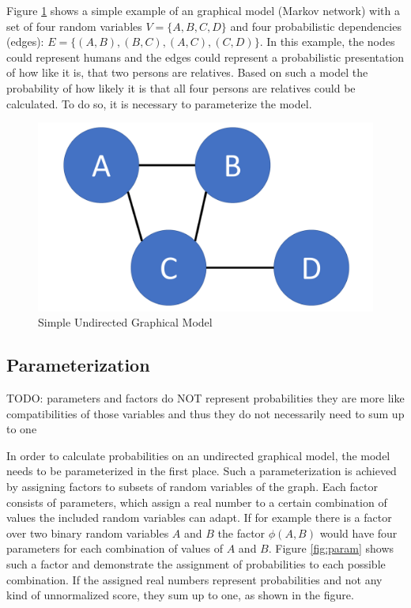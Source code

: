 Figure \ref{fig:basic} shows a simple example of an graphical model (Markov network) with a set of four random variables $V=\{A,B,C,D\}$ and four probabilistic dependencies (edges): $E=\{(A,B),(B,C),(A,C),(C,D)\}$. In this example, the nodes could represent humans and the edges could represent a probabilistic presentation of how like it is, that two persons are relatives. Based on such a model the probability of how likely it is that all four persons are relatives could be calculated. To do so, it is necessary to parameterize the model.

\begin{figure}[htpb]
  \centering
  	\includegraphics[scale=0.3]{img/basic.pdf} 
  \caption{Simple Undirected Graphical Model}
  \label{fig:basic}
\end{figure}

\subsection{Parameterization}

TODO: parameters and factors do NOT represent probabilities \cite{koller2009probabilistic} they are more like compatibilities of those variables and thus they do not necessarily need to sum up to one

In order to calculate probabilities on an undirected graphical model, the model needs to be parameterized in the first place. Such a parameterization is achieved by assigning factors to subsets of random variables of the graph. Each factor consists of parameters, which assign a real number to a certain combination of values the included random variables can adapt. If for example there is a factor over two binary random variables $A$ and $B$ the factor $\phi(A,B)$ would have four parameters for each combination of values of $A$ and $B$. Figure \ref{fig:param} shows such a factor and demonstrate the assignment of probabilities to each possible combination. If the assigned real numbers represent probabilities and not any kind of unnormalized score, they sum up to one, as shown in the figure.

